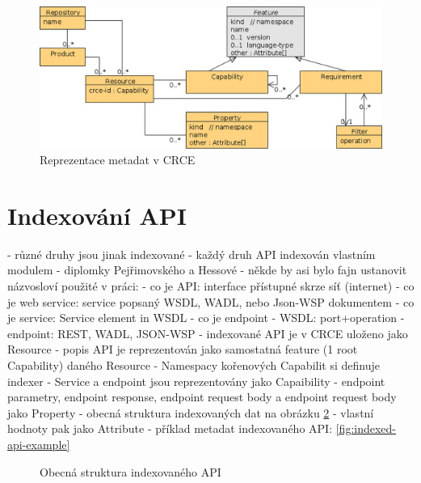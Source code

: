 \documentclass[czech,DP]{thesiskiv}
\begin{document}
 \begin{figure}[h]
 	\centering
 	\includegraphics{resource-uml}
 	\caption{Reprezentace metadat v CRCE}
 	\label{fig:crce-resource-uml}
 \end{figure}

\section{Indexování API}
\label{sec:api-index}

- různé druhy jsou jinak indexované
- každý druh API indexován vlastním modulem - diplomky Pejřimovského \cite{pejrimovsky2015ws} a Hessové \cite{hessova2015rest}
- někde by asi bylo fajn ustanovit názvosloví použité v práci:
	- co je API: interface přístupné skrze síť (internet)
	- co je web service: service popsaný WSDL, WADL, nebo Json-WSP dokumentem
	- co je service: Service element in WSDL
	- co je endpoint
		- WSDL: port+operation
		- endpoint: REST, WADL, JSON-WSP
- indexované API je v CRCE uloženo jako Resource		
- popis API je reprezentován jako samostatná feature (1 root Capability) daného Resource
	- Namespacy kořenových Capabilit si definuje indexer
- Service a endpoint jsou reprezentovány jako Capaibility
- endpoint parametry, endpoint response, endpoint request body a endpoint request body jako Property
	- obecná struktura indexovaných dat na obrázku \ref{fig:indexed-api-general}
- vlastní hodnoty pak jako Attribute
- příklad metadat indexovaného API: \ref{fig:indexed-api-example}

\begin{figure}[h]
	\centering
	\caption{Obecná struktura indexovaného API}
	\label{fig:indexed-api-general}
\end{figure}
\end{document}
